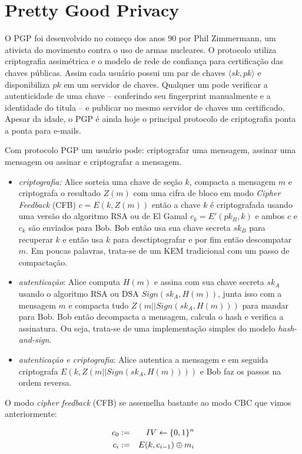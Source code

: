 \section{Pretty Good Privacy}
\label{sec:pgp}

O PGP foi desenvolvido no começo dos anos 90 por Phil Zimmermann, um ativista do movimento contra o uso de armas nucleares.
O protocolo utiliza criptografia assimétrica e o modelo de rede de confiança para certificação das chaves públicas.
Assim cada usuário possui um par de chaves $\langle sk, pk \rangle$ e disponibiliza $pk$ em um servidor de chaves.
Qualquer um pode verificar a autenticidade de uma chave -- conferindo seu fingerprint manualmente e a identidade do titula -- e publicar no mesmo servidor de chaves um certificado.
Apesar da idade, o PGP é ainda hoje o principal protocolo de criptografia ponta a ponta para e-mails.

Com protocolo PGP um usuário pode: criptografar uma mensagem, assinar uma mensagem ou assinar e criptografar a mensagem.
\begin{itemize}
\item {\em criptografia:} Alice sorteia uma chave de seção $k$, compacta a mensagem $m$ e criptografa o resultado $Z(m)$ com uma cifra de bloco em modo {\em Cipher Feedback} (CFB) $c = E(k, Z(m))$ então a chave $k$ é criptografada usando uma versão do algoritmo RSA ou de El Gamal $c_k = E'(pk_B, k)$ e ambos $c$ e $c_k$ são enviados para Bob.
  Bob então usa sua chave secreta $sk_B$ para recuperar $k$ e então usa $k$ para desctiptografar e por fim então descompatar $m$.
  Em poucas palavras, trata-se de um KEM tradicional com um passo de compactação.
\item {\em autenticação}: Alice computa $H(m)$ e assina com sua chave secreta $sk_A$ usando o algoritmo RSA ou DSA $Sign(sk_A, H(m))$, junta isso com a mensagem $m$ e compacta tudo $Z(m||Sign(sk_A, H(m)))$ para mandar para Bob.
Bob então decompacta a mensagem, calcula o hash e verifica a assinatura.
Ou seja, trata-se de uma implementação simples do modelo {\em hash-and-sign}.
\item {\em autenticação e criptografia}: Alice autentica a mensagem e em seguida criptografa $E(k, Z(m||Sign(sk_A, H(m))))$ e Bob faz os passos na ordem reversa. 
\end{itemize}

O modo {\em cipher feedback} (CFB) se assemelha bastante ao modo CBC que vimos anteriormente:

\begin{eqnarray*}
  c_0 & := & IV \leftarrow \{0,1\}^n\\
  c_i & := & E(k, c_{i-1}) \oplus m_i
\end{eqnarray*}


